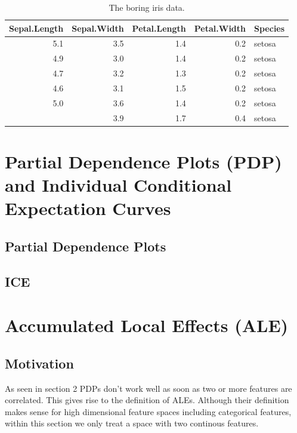 \documentclass[]{krantz}
\begin{document}
\begin{table}[t]

\caption{\label{tab:iris}The boring iris data.}
\centering
\begin{tabular}{rrrrl}
\toprule
Sepal.Length & Sepal.Width & Petal.Length & Petal.Width & Species\\
\midrule
5.1 & 3.5 & 1.4 & 0.2 & setosa\\
4.9 & 3.0 & 1.4 & 0.2 & setosa\\
4.7 & 3.2 & 1.3 & 0.2 & setosa\\
4.6 & 3.1 & 1.5 & 0.2 & setosa\\
5.0 & 3.6 & 1.4 & 0.2 & setosa\\
\addlinespace
5.4 & 3.9 & 1.7 & 0.4 & setosa\\
\bottomrule
\end{tabular}
\end{table}

\chapter{Partial Dependence Plots (PDP) and Individual Conditional
Expectation
Curves}\label{partial-dependence-plots-pdp-and-individual-conditional-expectation-curves}

\section{Partial Dependence Plots}\label{partial-dependence-plots}

\section{ICE}\label{ice}

\chapter{Accumulated Local Effects
(ALE)}\label{accumulated-local-effects-ale}

\section{Motivation}\label{motivation}

As seen in section 2 PDPs don't work well as soon as two or more
features are correlated. This gives rise to the definition of ALEs.
Although their definition makes sense for high dimensional feature
spaces including categorical features, within this section we only treat
a space with two continous features.
\end{document}
